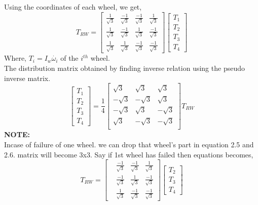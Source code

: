 \documentclass[10pt,a4paper]{report}
\begin{document}
Using the coordinates of each wheel, we get,
\begin{equation}
T_{RW}=\begin{bmatrix}
\frac{1}{\sqrt{3}} &\frac{-1}{\sqrt{3}}&\frac{-1}{\sqrt{3}}&\frac{1}{\sqrt{3}} \\
\frac{1}{\sqrt{3}} &\frac{-1}{\sqrt{3}}&\frac{1}{\sqrt{3}}&\frac{-1}{\sqrt{3}} \\
\frac{1}{\sqrt{3}} &\frac{1}{\sqrt{3}}&\frac{-1}{\sqrt{3}}&\frac{-1}{\sqrt{3}} 
\end{bmatrix}
\begin{bmatrix}
T_{1}\\T_{2}\\T_{3}\\T_{4}
\end{bmatrix}
\end{equation}
Where, $ T_{i}=I_{w}\dot{\omega_{i}} $ of the $ i^{th} $ wheel.
\\The distribution matrix obtained by finding inverse relation using the pseudo inverse matrix.
\begin{equation}
\begin{bmatrix}
T_{1}\\T_{2}\\T_{3}\\T_{4}
\end{bmatrix}
=\frac{1}{4}\begin{bmatrix}
\sqrt{3}&\sqrt{3}&\sqrt{3}\\
-\sqrt{3}&-\sqrt{3}&\sqrt{3}\\
-\sqrt{3}&\sqrt{3}&-\sqrt{3}\\
\sqrt{3}&-\sqrt{3}&-\sqrt{3}\\
\end{bmatrix}
T_{RW}
\end{equation}
\textbf{NOTE:}\\
Incase of failure of one wheel. we can drop that wheel's part in equation 2.5 and 2.6. matrix will become 3x3. Say if 1st wheel has failed then equations becomes,\\
\begin{equation}
T_{RW}=\begin{bmatrix}
 &\frac{-1}{\sqrt{3}}&\frac{-1}{\sqrt{3}}&\frac{1}{\sqrt{3}} \\
 &\frac{-1}{\sqrt{3}}&\frac{1}{\sqrt{3}}&\frac{-1}{\sqrt{3}} \\
 &\frac{1}{\sqrt{3}}&\frac{-1}{\sqrt{3}}&\frac{-1}{\sqrt{3}} 
\end{bmatrix}
\begin{bmatrix}
T_{2}\\T_{3}\\T_{4}
\end{bmatrix}
\end{equation}
\end{document}

